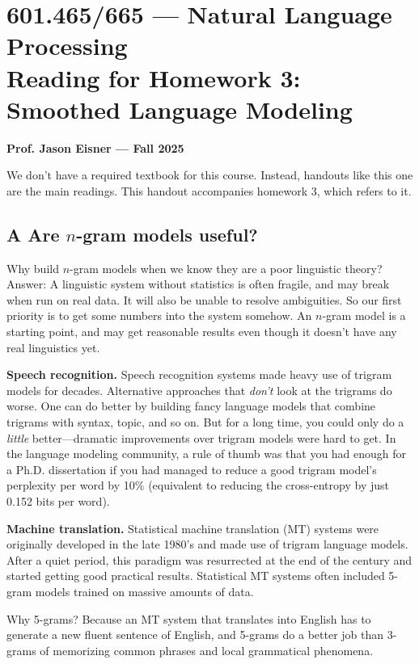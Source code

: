 \section*{601.465/665 --- Natural Language Processing \\ Reading for Homework 3: Smoothed Language Modeling}

\textbf{Prof. Jason Eisner --- Fall 2025}

We don’t have a required textbook for this course. Instead, handouts like this one are the main readings. This handout accompanies homework 3, which refers to it.

\subsection*{A Are $n$-gram models useful?}

Why build $n$-gram models when we know they are a poor linguistic theory? Answer: A linguistic system without statistics is often fragile, and may break when run on real data. It will also be unable to resolve ambiguities. So our first priority is to get some numbers into the system somehow. An $n$-gram model is a starting point, and may get reasonable results even though it doesn’t have any real linguistics yet.

\textbf{Speech recognition.} Speech recognition systems made heavy use of trigram models for decades. Alternative approaches that \textit{don’t} look at the trigrams do worse. One can do better by building fancy language models that combine trigrams with syntax, topic, and so on. But for a long time, you could only do a \textit{little} better—dramatic improvements over trigram models were hard to get. In the language modeling community, a rule of thumb was that you had enough for a Ph.D. dissertation if you had managed to reduce a good trigram model’s perplexity per word by 10\% (equivalent to reducing the cross-entropy by just 0.152 bits per word).

\textbf{Machine translation.} Statistical machine translation (MT) systems were originally developed in the late 1980’s and made use of trigram language models. After a quiet period, this paradigm was resurrected at the end of the century and started getting good practical results. Statistical MT systems often included 5-gram models trained on massive amounts of data.

Why 5-grams? Because an MT system that translates into English has to generate a new fluent sentence of English, and 5-grams do a better job than 3-grams of memorizing common phrases and local grammatical phenomena.

